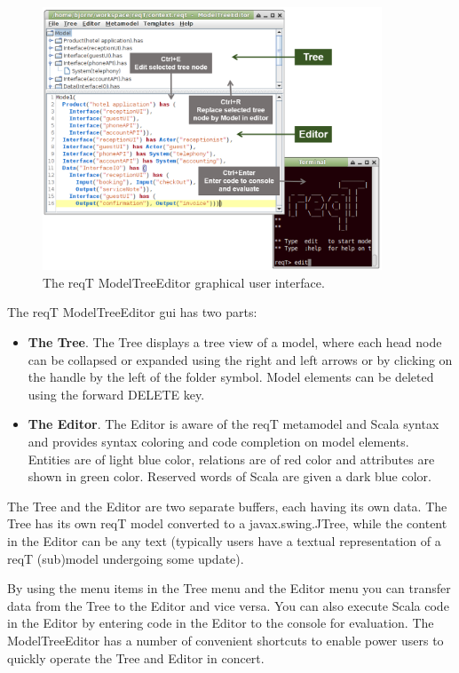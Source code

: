 \documentclass[11pt]{article}
\begin{document}
\begin{figure}[h]
    \centering
    \includegraphics[width=0.9\textwidth]{gui.png}
    \caption{The reqT ModelTreeEditor graphical user interface.}
    \label{fig:gui}
\end{figure}

The reqT ModelTreeEditor gui has two parts:
\begin{itemize}
\item {\bf The Tree}. The Tree displays a tree view of a model, where each head node can be collapsed or expanded using the right and left arrows or by clicking on the handle by the left of the folder symbol. Model elements can be deleted using the forward DELETE key.
\item {\bf The Editor}. The Editor is aware of the reqT metamodel and Scala syntax and provides syntax coloring and code completion on model elements. Entities are of light blue color, relations are of red color and attributes are shown in green color. Reserved words of Scala are given a dark blue color.
\end{itemize}

The Tree and the Editor are two separate buffers, each having its own data. The Tree has its own reqT model converted to a javax.swing.JTree, while the content in the Editor can be any text (typically users have a textual representation of a reqT (sub)model undergoing  some update). 

By using the menu items in the Tree menu and the Editor menu you can transfer data from the Tree to the Editor and vice versa. You can also execute Scala code in the Editor by entering code in the Editor to the console for evaluation. The ModelTreeEditor has a number of convenient shortcuts to enable power users to quickly operate the Tree and Editor in concert.
\end{document}
